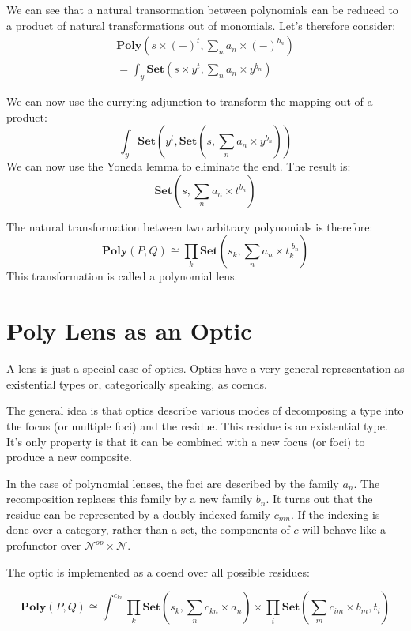\documentclass[11pt]{amsart}
\begin{document}
We can see that a natural transormation between polynomials can be reduced to a product of natural transformations out of monomials. Let's therefore consider:
\begin{align*}
 \mathbf{Poly}\left(s \times (-)^t, \sum_n a_n \times (-)^{b_n}\right) 
 \\
 = \int_y \mathbf{Set} \left( s \times y^t, \sum_n a_n \times y^{b_n}\right)
 \end{align*}
 
 We can now use the currying adjunction to transform the mapping out of a product:
\[ \int_y \mathbf{Set} \left( 
    y^t,  \mathbf{Set}\left(s, \sum_n a_n \times y^{b_n} \right)  \right) \]
 We can now use the Yoneda lemma to eliminate the end. The result is:
 \[ \mathbf{Set}\left(s, \sum_n a_n \times t^{b_n} \right) \]
 
The natural transformation between two arbitrary polynomials is therefore:
 \[ \mathbf{Poly}(P, Q) \cong \prod_k \mathbf{Set}\left(s_k, \sum_n a_n \times t_{k}^{\;b_n} \right) \]
This transformation is called a polynomial lens.

\section{Poly Lens as an Optic}

A lens is just a special case of optics. Optics have a very general representation as existential types or, categorically speaking, as coends. 

The general idea is that optics describe various modes of decomposing a type into the focus (or multiple foci) and the residue. This residue is an existential type. It's only property is that it can be combined with a new focus (or foci) to produce a new composite.

In the case of polynomial lenses, the foci are described by the family $a_n$. The recomposition replaces this family by a new family $b_n$. It turns out that the residue can be represented by a doubly-indexed family $c_{m n}$. If the indexing is done over a category, rather than a set, the components of $c$ will behave like a profunctor over $\mathcal{N}^{op} \times \mathcal{N}$.

The optic is implemented as a coend over all possible residues:

\[ \mathbf{Poly}(P, Q) \cong \int^{c_{k i}}  \prod_k \mathbf{Set} \left(s_k, \sum_n c_{k n} \times a_n\right) \times \prod_i  \mathbf{Set} \left(\sum_m c_{i m} \times b_m, t_i \right) \]
\end{document}
